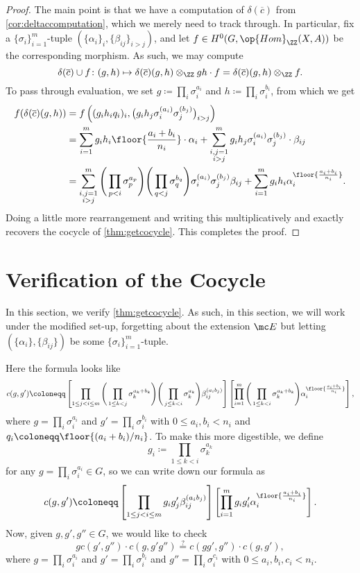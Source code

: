 \documentclass{article}
\numberwithin{equation}{section}
\begin{document}
\begin{proof}
	The main point is that we have a computation of $\delta(\overline c)$ from \autoref{cor:deltaccomputation}, which we merely need to track through. In particular, fix a $\{\sigma_i\}_{i=1}^m$-tuple $(\{\alpha_i\}_i,\{\beta_{ij}\}_{i>j})$, and let $f\in H^0(G,\op{Hom}_\ZZ(X,A))$ be the corresponding morphism. As such, we may compute
	\[\delta(\overline c)\cup f\colon(g,h)\mapsto\delta(\overline c)(g,h)\otimes_\ZZ gh\cdot f=\delta(\overline c)(g,h)\otimes_\ZZ f.\]
	To pass through evaluation, we set $g\coloneqq\prod_i\sigma_i^{a_i}$ and $h\coloneqq\prod_i\sigma_i^{b_i}$, from which we get
	\begin{align*}
		f(\delta(\overline c)(g,h)) &= f\left((g_ih_iq_i)_i,\big(g_ih_j\sigma_i^{(a_i)}\sigma_j^{(b_j)}\big)_{i>j}\right) \\
		&= \sum_{i=1}^mg_ih_i\floor{\frac{a_i+b_i}{n_i}}\cdot\alpha_i+\sum_{\substack{i,j=1\\i>j}}^mg_ih_j\sigma_i^{(a_i)}\sigma_j^{(b_j)}\cdot\beta_{ij} \\
		&= \sum_{\substack{i,j=1\\i>j}}^m\Bigg(\prod_{p<i}\sigma_p^{a_p}\Bigg)\Bigg(\prod_{q<j}\sigma_q^{b_q}\Bigg)\sigma_i^{(a_i)}\sigma_j^{(b_j)}\beta_{ij}+\sum_{i=1}^mg_ih_i\alpha_i^{\floor{\frac{a_i+b_i}{n_i}}}.
	\end{align*}
	Doing a little more rearrangement and writing this multiplicatively and exactly recovers the cocycle of \autoref{thm:getcocycle}. This completes the proof.
\end{proof}

\newpage
\appendix
\section{Verification of the Cocycle} \label{sec:verifycocycle}
In this section, we verify \autoref{thm:getcocycle}. As such, in this section, we will work under the modified set-up, forgetting about the extension $\mc E$ but letting $(\{\alpha_i\},\{\beta_{ij}\})$ be some $\{\sigma_i\}_{i=1}^m$-tuple.

Here the formula looks like
\[c(g,g')\coloneqq\left[\prod_{1\le j<i\le m}\Bigg(\prod_{1\le k<j}\sigma_k^{a_k+b_k}\Bigg)\Bigg(\prod_{j\le k<i}\sigma_k^{a_k}\Bigg)\beta_{ij}^{(a_ib_j)}\right]\left[\prod_{i=1}^m\Bigg(\prod_{1\le k<i}\sigma_k^{a_k+b_k}\Bigg)\alpha_i^{\floor{\frac{a_i+b_i}{n_i}}}\right],\]
where $g=\prod_i\sigma_i^{a_i}$ and $g'=\prod_i\sigma_i^{b_i}$ with $0\le a_i,b_i<n_i$ and $q_i\coloneqq\floor{(a_i+b_i)/n_i}$. To make this more digestible, we define
\[g_i\coloneqq\prod_{1\le k<i}\sigma_k^{a_k}\]
for any $g=\prod_i\sigma_i^{a_i}\in G$, so we can write down our formula as
\[c(g,g')\coloneqq\left[\prod_{1\le j<i\le m}g_ig'_j\beta_{ij}^{(a_ib_j)}\right]\left[\prod_{i=1}^mg_ig'_i\alpha_i^{\floor{\frac{a_i+b_i}{n_i}}}\right].\]
Now, given $g,g',g''\in G$, we would like to check
\[gc(g',g'')\cdot c(g,g'g'')\stackrel?=c(gg',g'')\cdot c(g,g'),\]
where $g=\prod_i\sigma_i^{a_i}$ and $g'=\prod_i\sigma_i^{b_i}$ and $g''=\prod_i\sigma_i^{c_i}$ with $0\le a_i,b_i,c_i<n_i$.
\end{document}
